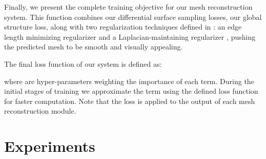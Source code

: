 \documentclass{article}
\begin{document}
Finally, we present the complete training objective for our mesh reconstruction system. This function combines our differential surface sampling losses, our global structure loss, along with two regularization techniques defined in \citet{Pixel2Mesh}: an edge length minimizing regularizer  and a Laplacian-maintaining regularizer , pushing the predicted mesh to be smooth and visually appealing. 


The final loss function of our system is defined as: 

where  are hyper-parameters weighting the importance of each term. During the initial stages of training we approximate the  term using the defined  loss function for faster computation. Note that the loss  is applied to the output of each mesh reconstruction module. 

\section{Experiments}
\end{document}
